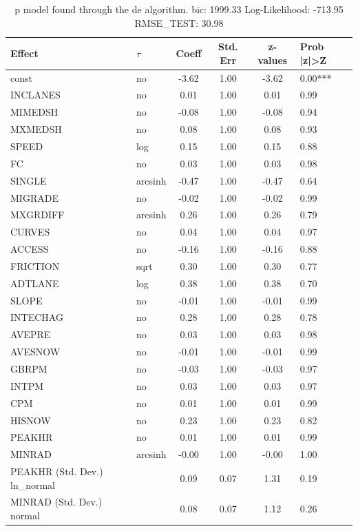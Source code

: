 \begin{table}
	\caption{p model found through the de algorithm. bic: 1999.33 Log-Likelihood: -713.95 RMSE_TEST: 30.98}
	\begin{center}
		\begin{tabular}{|l|l|c|c|c|l|}
			\hline
			Effect & $\tau$ & Coeff & Std. Err & z-values & Prob |z|>Z \\
			\hline
			const & no & -3.62 & 1.00 & -3.62 & 0.00*** \\
			\hline
			INCLANES & no & 0.01 & 1.00 & 0.01 & 0.99 \\
			\hline
			MIMEDSH & no & -0.08 & 1.00 & -0.08 & 0.94 \\
			\hline
			MXMEDSH & no & 0.08 & 1.00 & 0.08 & 0.93 \\
			\hline
			SPEED & log & 0.15 & 1.00 & 0.15 & 0.88 \\
			\hline
			FC & no & 0.03 & 1.00 & 0.03 & 0.98 \\
			\hline
			SINGLE & arcsinh & -0.47 & 1.00 & -0.47 & 0.64 \\
			\hline
			MIGRADE & no & -0.02 & 1.00 & -0.02 & 0.99 \\
			\hline
			MXGRDIFF & arcsinh & 0.26 & 1.00 & 0.26 & 0.79 \\
			\hline
			CURVES & no & 0.04 & 1.00 & 0.04 & 0.97 \\
			\hline
			ACCESS & no & -0.16 & 1.00 & -0.16 & 0.88 \\
			\hline
			FRICTION & sqrt & 0.30 & 1.00 & 0.30 & 0.77 \\
			\hline
			ADTLANE & log & 0.38 & 1.00 & 0.38 & 0.70 \\
			\hline
			SLOPE & no & -0.01 & 1.00 & -0.01 & 0.99 \\
			\hline
			INTECHAG & no & 0.28 & 1.00 & 0.28 & 0.78 \\
			\hline
			AVEPRE & no & 0.03 & 1.00 & 0.03 & 0.98 \\
			\hline
			AVESNOW & no & -0.01 & 1.00 & -0.01 & 0.99 \\
			\hline
			GBRPM & no & -0.03 & 1.00 & -0.03 & 0.97 \\
			\hline
			INTPM & no & 0.03 & 1.00 & 0.03 & 0.97 \\
			\hline
			CPM & no & 0.01 & 1.00 & 0.01 & 0.99 \\
			\hline
			HISNOW & no & 0.23 & 1.00 & 0.23 & 0.82 \\
			\hline
			PEAKHR & no & 0.01 & 1.00 & 0.01 & 0.99 \\
			\hline
			MINRAD & arcsinh & -0.00 & 1.00 & -0.00 & 1.00 \\
			\hline
			PEAKHR (Std. Dev.) ln_normal &  & 0.09 & 0.07 & 1.31 & 0.19 \\
			\hline
			MINRAD (Std. Dev.) normal &  & 0.08 & 0.07 & 1.12 & 0.26 \\
			\hline
		\end{tabular}
	\end{center}
\end{table}